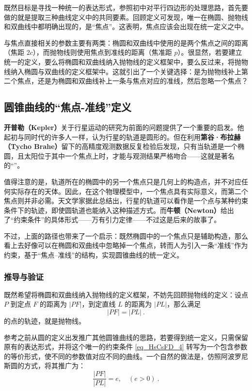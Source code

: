 既然目标是寻找一种统一的表达形式，参照初中对平行四边形的处理思路，首先要做的就是提取三种曲线定义中的共同要素。回顾定义可发现，唯一在椭圆、抛物线和双曲线中都明确出现的，是“焦点”。这表明，焦点应该会出现在统一定义之中。

与焦点直接相关的参数主要有两类：椭圆和双曲线中使用的是两个焦点之间的距离（焦距 $2c$），而抛物线则使用焦点到准线的距离（焦准距 $p$）。很显然，若要建立统一的定义，要么将椭圆和双曲线纳入抛物线的定义框架中，要么反过来，将抛物线纳入椭圆与双曲线的定义框架中。这就引出了一个关键选择：是为抛物线补上第二个焦点，还是为椭圆和双曲线补上一条与焦点对应的准线，然后忽略一个焦点？

\subsection{圆锥曲线的“焦点-准线”定义}

\textbf{开普勒（Kepler）}关于行星运动的研究为前面的问题提供了一个重要的启发。他起初与同时代的许多人一样，认为行星的轨道是圆形的。但在利用\textbf{第谷·布拉赫（Tycho Brahe）}留下的高精度观测数据反复检验后发现，只有当轨道是一个椭圆，且太阳位于其中一个焦点上时，才能与观测结果严格吻合——这就是著名的“”。

值得注意的是，轨道所在的椭圆中的另一个焦点只是几何上的构造点，并不对应任何实际存在的天体。因此，在这个物理模型中，一个焦点具有实际意义，而第二个焦点则并非必需。天文学家据此总结出，行星的轨道可以看作是一个点与某种约束条件下的轨迹，即使圆轨道也能纳入这种描述方式。而\textbf{牛顿（Newton）}给出了“约束条件”的具体形式——万有引力定律——不过这是后来的故事了。

不过，上面的路径也带来了一个启示：既然椭圆中的一个焦点只是辅助构造，那么看上去好像可以在椭圆和双曲线中忽略掉一个焦点，转而人为引入一条“准线”作为约束，基于“焦点–准线”的结构，实现圆锥曲线的统一定义。

\subsubsection{推导与验证}

既然希望将椭圆和双曲线纳入抛物线的定义框架，不妨先回顾抛物线的定义：设点 $P$ 到定点 $F$ 的距离为 $|PF|$，到定直线 $L$ 的距离为 $|PL|$，那么满足
\begin{equation}\label{eq_HsCsFD_4}
|PF| = |PL|~.
\end{equation}
的点的轨迹，就是抛物线。

参考之前从圆的定义出发推广其他圆锥曲线的思路，若要得到统一定义，只需保留原有的表达形式，并将这个唯一的约束条件 \autoref{eq_HsCsFD_4} 转写为一个包含参数的等价形式，使不同的参数值对应不同的曲线。一个自然的做法是，仿照阿波罗尼斯圆的方式，将其推广为：
\begin{equation}\label{eq_HsCsFD_1}
\frac{|PF|}{|PL|} = e,\quad(e>0)~.
\end{equation}

